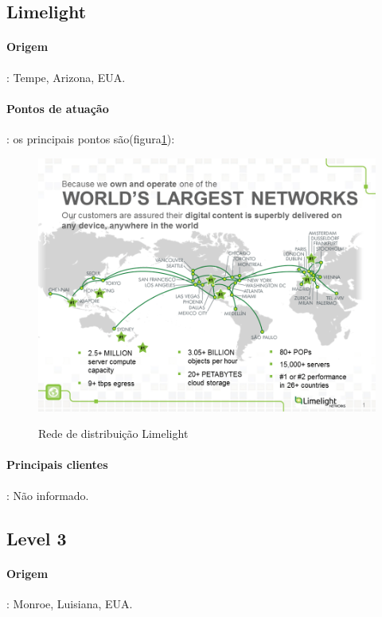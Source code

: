 \subsection{Limelight}
\paragraph{Origem}: Tempe, Arizona, EUA.
\paragraph{Pontos de atua\c{c}\~ao}: os principais pontos s\~ao(figura\ref{figura:limelight_map}):
\begin{figure}[H]
\caption{Rede de distribui\c{c}\~ao Limelight}
\includegraphics[width=14cm]{Figuras/limelight_map.png} 
\label{figura:limelight_map}
\end{figure}
\paragraph{Principais clientes}: N\~ao informado.
\subsection{Level 3}
\paragraph{Origem}: Monroe, Luisiana, EUA. 
